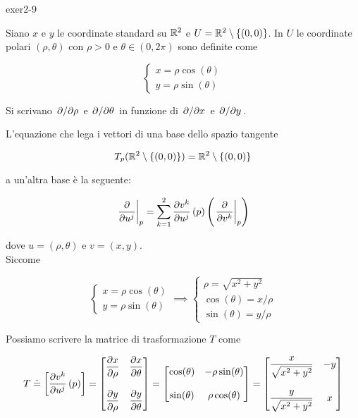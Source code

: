 {exer2-9}
{
Siano $ x $ e $ y $ le coordinate standard su $ \mathbb{R}^{2} $ e $ U = \mathbb{R}^{2} \setminus \{(0,0)\} $. In $ U $ le coordinate polari $ (\rho, \theta) $ con $ \rho > 0 $ e $ \theta \in (0,2\pi) $ sono definite come

\begin{equation}
	\begin{cases}
		x = \rho \cos(\theta) \\
		y = \rho \sin(\theta)
	\end{cases}
\end{equation}

Si scrivano $ \pdv*{\rho} $ e $ \pdv*{\theta} $ in funzione di $ \pdv*{x} $ e $ \pdv*{y} $.
}
{
L'equazione che lega i vettori di una base dello spazio tangente

\begin{equation}
	T_{p}(\mathbb{R}^{2} \setminus \{(0,0)\}) = \mathbb{R}^{2} \setminus \{(0,0)\}
\end{equation}

a un'altra base è la seguente:

\begin{equation}
	\eval{\pdv{u^{j}}}_{p} = \sum_{k=1}^{2} \pdv{v^{k}}{u^{j}} \, (p) \left( \eval{\pdv{v^{k}}}_{p} \right)
\end{equation}

dove $ u = (\rho,\theta) $ e $ v = (x,y) $. \\
Siccome

\begin{equation}
	\begin{cases}
		x = \rho \cos(\theta) \\
		y = \rho \sin(\theta)
	\end{cases}%
	\implies %
	\begin{cases}
		\rho = \sqrt{x^{2} + y^{2}} \\
		\cos(\theta) = x / \rho \\
		\sin(\theta) = y / \rho
	\end{cases}
\end{equation}

Possiamo scrivere la matrice di trasformazione $ T $ come

\begin{equation}
	T \doteq \left[ \pdv{v^{k}}{u^{j}} \, (p) \right] = \bmqty{ \dpdv{x}{\rho} & \dpdv{x}{\theta} \\ \\ \dpdv{y}{\rho} & \dpdv{y}{\theta} } %
	= \bmqty{ \cos(\theta) & - \rho \sin(\theta) \\ \\ \sin(\theta) & \rho \cos(\theta) } %
	= \bmqty{ \dfrac{x}{\sqrt{x^{2} + y^{2}}} & - y \\ \\ \dfrac{y}{\sqrt{x^{2} + y^{2}}} & x }
\end{equation}

}
